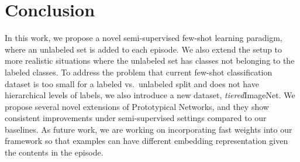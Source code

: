 \section{Conclusion}

In this work, we propose a novel semi-supervised few-shot learning paradigm, where an unlabeled set
is added to each episode. We also extend the setup to more realistic situations where the unlabeled
set has classes not belonging to the labeled classes. To address the problem that current few-shot
classification dataset is too small for a labeled vs.\ unlabeled split and does not have
hierarchical levels of labels, we also introduce a new dataset, \textit{tiered}ImageNet. We propose
several novel extensions of Prototypical Networks, and they show consistent improvements under 
semi-supervised settings compared to our baselines. As future work, we are working on incorporating 
fast weights \citep{ba2016fw,FinnC2017} into our framework so that examples can have different
embedding representation given the contents in the episode.
